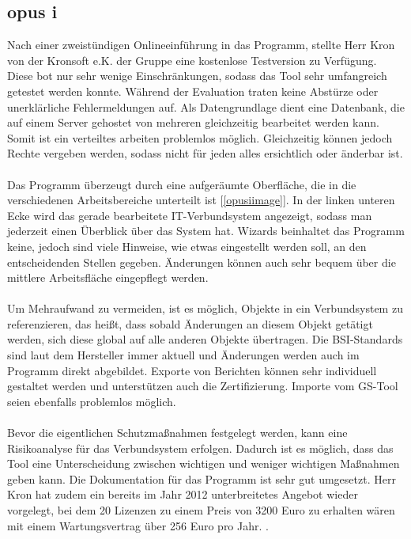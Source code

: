 \subsection{opus i}
Nach einer zweistündigen Onlineeinführung in das Programm, stellte Herr Kron von der Kronsoft e.K. der Gruppe eine kostenlose Testversion zu Verfügung. Diese bot nur sehr wenige Einschränkungen, sodass das Tool sehr umfangreich getestet werden konnte. Während der Evaluation traten keine Abstürze oder unerklärliche Fehlermeldungen auf. Als Datengrundlage dient eine Datenbank, die auf einem Server gehostet von mehreren gleichzeitig bearbeitet werden kann. Somit ist ein verteiltes arbeiten problemlos möglich. Gleichzeitig können jedoch Rechte vergeben werden, sodass nicht für jeden alles ersichtlich oder änderbar ist. 
\\
\\
Das Programm überzeugt durch eine aufgeräumte Oberfläche, die in die verschiedenen Arbeitsbereiche unterteilt ist [\ref{opusiimage}]. In der linken unteren Ecke wird das gerade bearbeitete IT-Verbundsystem angezeigt, sodass man jederzeit einen Überblick über das System hat. Wizards beinhaltet das Programm keine, jedoch sind viele Hinweise, wie etwas eingestellt werden soll, an den entscheidenden Stellen gegeben. Änderungen können auch sehr bequem über die mittlere Arbeitsfläche eingepflegt werden.
\\
\\
Um Mehraufwand zu vermeiden, ist es möglich, Objekte in ein Verbundsystem zu referenzieren, das heißt, dass sobald Änderungen an diesem Objekt getätigt werden, sich diese global auf alle anderen Objekte übertragen. Die BSI-Standards sind laut dem Hersteller immer aktuell und Änderungen werden auch im Programm direkt abgebildet. Exporte von Berichten können sehr individuell gestaltet werden und unterstützen auch die Zertifizierung. Importe vom GS-Tool seien ebenfalls problemlos möglich.
\\
\\
Bevor die eigentlichen Schutzmaßnahmen festgelegt werden, kann eine Risikoanalyse für das Verbundsystem erfolgen. Dadurch ist es möglich, dass das Tool eine Unterscheidung zwischen wichtigen und weniger wichtigen Maßnahmen geben kann. Die Dokumentation für das Programm ist sehr gut umgesetzt. Herr Kron hat zudem ein bereits im Jahr 2012 unterbreitetes Angebot wieder vorgelegt, bei dem 20 Lizenzen zu einem Preis von 3200 Euro zu erhalten wären mit einem Wartungsvertrag über 256 Euro pro Jahr. \cite{opusi}.
\\
